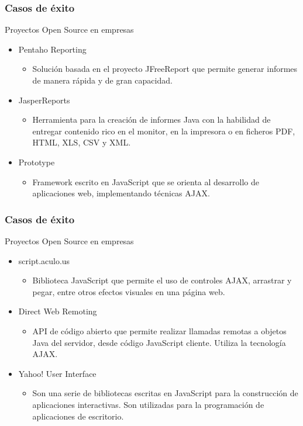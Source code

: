 \frame
{
\frametitle{Casos de éxito}
\Large{Proyectos Open Source en empresas}
\normalsize
\begin{itemize}
	\item Pentaho Reporting
	\begin{itemize}
		\item Solución basada en el proyecto JFreeReport que permite generar informes
			de manera rápida y de gran capacidad.
	\end{itemize}
	\item JasperReports
	\begin{itemize}
		\item Herramienta para la creación de informes Java con la habilidad de entregar
			contenido rico en el monitor, en la impresora o en ficheros PDF, HTML, XLS, CSV y XML.
	\end{itemize}
	\item Prototype
	\begin{itemize}
		\item Framework escrito en JavaScript que se orienta al desarrollo de aplicaciones web,
			implementando técnicas AJAX.
	\end{itemize}
\end{itemize}
}

\frame
{
\frametitle{Casos de éxito}
\Large{Proyectos Open Source en empresas}
\normalsize
\begin{itemize}
	\item script.aculo.us
	\begin{itemize}
		\item Biblioteca JavaScript que permite el uso de controles AJAX, arrastrar y pegar,
			entre otros efectos visuales en una página web.
	\end{itemize}
	\item Direct Web Remoting
	\begin{itemize}
		\item  API de código abierto que permite realizar llamadas remotas a objetos Java del
			servidor, desde código JavaScript cliente. Utiliza la tecnología AJAX.
	\end{itemize}
	\item Yahoo! User Interface
	\begin{itemize}
		\item Son una serie de bibliotecas escritas en JavaScript para la construcción de
			 aplicaciones interactivas. Son utilizadas para la programación de aplicaciones de escritorio.
	\end{itemize}
\end{itemize}
}

